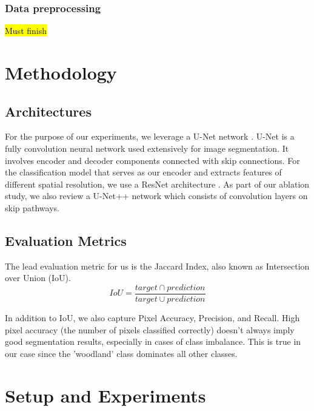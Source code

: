 \documentclass[conference]{IEEEtran}
\begin{document}
\subsubsection{Data preprocessing}

\hl{Must finish}

\section{Methodology}
\subsection{Architectures}

For the purpose of our experiments, we leverage a U-Net network \cite{ronneberger2015unet}. U-Net is a fully convolution neural network used extensively for image segmentation. It involves encoder and decoder components connected with skip connections. For the classification model that serves as our encoder and extracts features of different spatial resolution, we use a ResNet architecture \cite{DBLP:journals/corr/HeZRS15}. As part of our ablation study, we also review a U-Net++ network \cite{DBLP:journals/corr/abs-1807-10165} which consists of convolution layers on skip pathways.

\subsection{Evaluation Metrics}
 The lead evaluation metric for us is the Jaccard Index, also known as Intersection over Union (IoU).
\begin{equation*}
    IoU=\frac{target \cap prediction}{target \cup prediction}
\end{equation*}

In addition to IoU, we also capture Pixel Accuracy, Precision, and Recall. High pixel accuracy (the number of pixels classified correctly) doesn't always imply good segmentation results, especially in cases of class imbalance. This is true in our case since the 'woodland' class dominates all other classes.

\section{Setup and Experiments}
\end{document}
